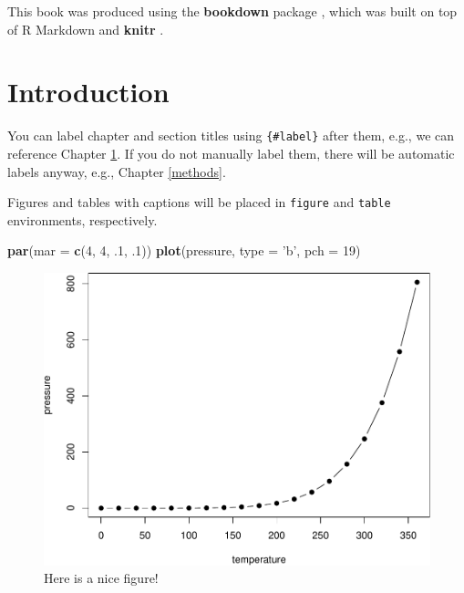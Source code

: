 \documentclass[]{book}
\newenvironment{Shaded}{\begin{snugshade}}{\end{snugshade}}
\newcommand{\KeywordTok}[1]{\textcolor[rgb]{0.13,0.29,0.53}{\textbf{{#1}}}}
\newcommand{\DataTypeTok}[1]{\textcolor[rgb]{0.13,0.29,0.53}{{#1}}}
\newcommand{\DecValTok}[1]{\textcolor[rgb]{0.00,0.00,0.81}{{#1}}}
\newcommand{\StringTok}[1]{\textcolor[rgb]{0.31,0.60,0.02}{{#1}}}
\newcommand{\NormalTok}[1]{{#1}}
\theoremstyle{definition}
\theoremstyle{definition}
\theoremstyle{definition}
\theoremstyle{remark}
\begin{document}
This book was produced using the \textbf{bookdown} package
\citep{R-bookdown}, which was built on top of R Markdown and
\textbf{knitr} \citep{xie2015}.

\chapter{Introduction}\label{intro}

You can label chapter and section titles using \texttt{\{\#label\}}
after them, e.g., we can reference Chapter \ref{intro}. If you do not
manually label them, there will be automatic labels anyway, e.g.,
Chapter \ref{methods}.

Figures and tables with captions will be placed in \texttt{figure} and
\texttt{table} environments, respectively.

\begin{Shaded}
\begin{Highlighting}[]
\KeywordTok{par}\NormalTok{(}\DataTypeTok{mar =} \KeywordTok{c}\NormalTok{(}\DecValTok{4}\NormalTok{, }\DecValTok{4}\NormalTok{, .}\DecValTok{1}\NormalTok{, .}\DecValTok{1}\NormalTok{))}
\KeywordTok{plot}\NormalTok{(pressure, }\DataTypeTok{type =} \StringTok{'b'}\NormalTok{, }\DataTypeTok{pch =} \DecValTok{19}\NormalTok{)}
\end{Highlighting}
\end{Shaded}

\begin{figure}

{\centering \includegraphics[width=0.8\linewidth]{01-intro_files/figure-latex/nice-fig-1} 

}

\caption{Here is a nice figure!}\label{fig:nice-fig}
\end{figure}
\end{document}

